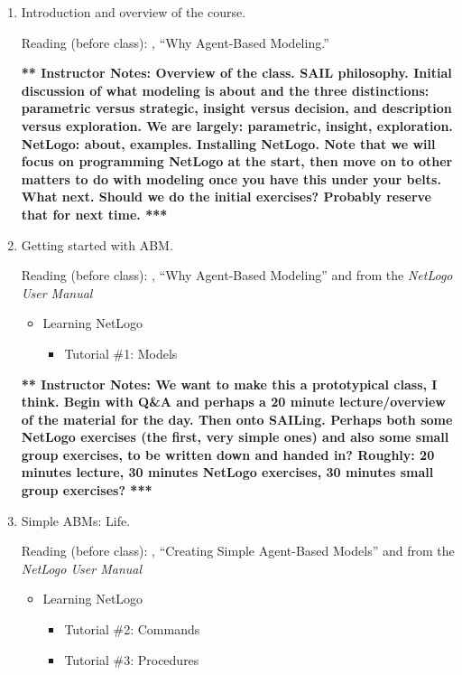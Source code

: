 \documentclass[11pt]{article}
\begin{document}
\begin{enumerate}
\item  Introduction and overview of the course. 

Reading (before class): \citep[chapter 0]{wilensky_rand_2015}, ``Why
Agent-Based Modeling.''

\ifnum{}
{\bf *** Instructor Notes: Overview of the class. SAIL philosophy. Initial discussion of what modeling is
  about and the three distinctions: parametric versus strategic,
  insight versus decision, and description versus exploration. We are
  largely:
parametric,  insight, exploration. NetLogo: about,
examples. Installing NetLogo. Note that we will focus on programming
NetLogo at the start, then move on to other matters to do with
modeling once you have this under your belts.
What next. Should we do the initial exercises? Probably reserve that
for next time. ***}
\fi

\item Getting started with ABM.

Reading (before class): \citep[chapter 1]{wilensky_rand_2015}, ``Why
Agent-Based Modeling'' and from the {\it NetLogo User Manual}
\begin{itemize}
\item Learning NetLogo
\begin{itemize}
\item   Tutorial \#1: Models
\end{itemize}
\end{itemize}

\ifnum{}
{\bf *** Instructor Notes: We want to make this a prototypical class,
  I think. Begin with Q\&A and perhaps a 20 minute lecture/overview of
the material for the day. Then onto SAILing. Perhaps both some NetLogo
exercises (the first, very simple ones) and also some small group
exercises, to be written down and handed in? Roughly: 20 minutes
lecture, 30 minutes NetLogo exercises, 30 minutes small group
exercises? ***}
\fi
\item Simple ABMs: Life.

Reading (before class): \citep[chapter 2, pages 45--68]{wilensky_rand_2015},
``Creating Simple Agent-Based Models'' and from the {\it NetLogo User Manual}
\begin{itemize}
\item Learning NetLogo
\begin{itemize}
 \item  Tutorial \#2: Commands
 \item  Tutorial \#3: Procedures 
\end{itemize}
\end{itemize}


\end{enumerate}
\end{document}

